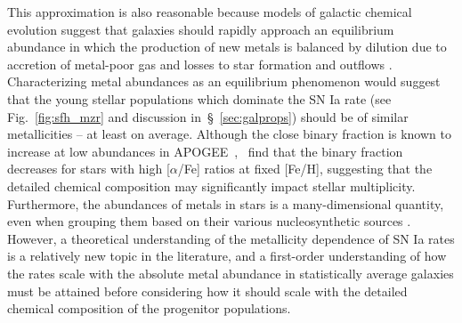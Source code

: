 \documentclass[ms.tex]{subfiles}
\begin{document}
This approximation is also reasonable because models of galactic chemical
evolution suggest that galaxies should rapidly approach an equilibrium
abundance in which the production of new metals is balanced by dilution due to
accretion of metal-poor gas and losses to star formation and outflows
\citep{Larson1972, Weinberg2017}.
Characterizing metal abundances as an equilibrium phenomenon would suggest that
the young stellar populations which dominate the SN Ia rate (see
Fig.~\ref{fig:sfh_mzr} and discussion in~\S~\ref{sec:galprops}) should be of
similar metallicities -- at least on average.
Although the close binary fraction is known to increase at low abundances
in APOGEE~\citep{Badenes2018, Moe2019},~\citet{Mazzola2020} find that the
binary fraction decreases for stars with high [$\alpha$/Fe] ratios at fixed
[Fe/H], suggesting that the detailed chemical composition may significantly
impact stellar multiplicity.
Furthermore, the abundances of metals in stars is a many-dimensional quantity,
even when grouping them based on their various nucleosynthetic sources
\citep{Ting2022}.
However, a theoretical understanding of the metallicity dependence of SN Ia
rates is a relatively new topic in the literature, and a first-order
understanding of how the rates scale with the absolute metal abundance in
statistically average galaxies must be attained before considering how it
should scale with the detailed chemical composition of the progenitor
populations.
\end{document}
